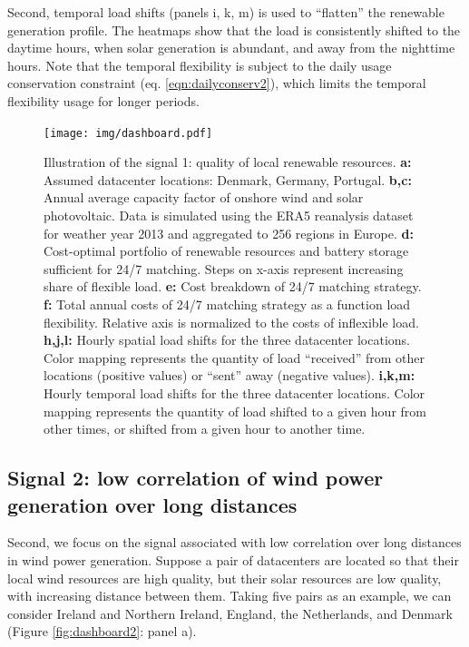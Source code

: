 Second, temporal load shifts (panels i, k, m) is used to \enquote{flatten} the renewable generation profile. The heatmaps show that the load is consistently shifted to the daytime hours, when solar generation is abundant, and away from the nighttime hours. Note that the temporal flexibility is subject to the daily usage conservation constraint (eq. \ref{eqn:dailyconserv2}), which limits the temporal flexibility usage for longer periods.


\begin{figure}
    \centering
    \texttt{[image: img/dashboard.pdf]}
    \caption{Illustration of the signal 1: quality of local renewable resources.
        \textbf{a:} Assumed datacenter locations: Denmark, Germany, Portugal.
        \textbf{b,c:} Annual average capacity factor of onshore wind and solar photovoltaic. Data is simulated using the ERA5 reanalysis dataset for weather year 2013 and aggregated to 256 regions in Europe.
        \textbf{d:} Cost-optimal portfolio of renewable resources and battery storage sufficient for 24/7 matching. Steps on x-axis represent increasing share of flexible load.
        \textbf{e:} Cost breakdown of 24/7 matching strategy.
        \textbf{f:} Total annual costs of 24/7 matching strategy as a function load flexibility. Relative axis is normalized to the costs of inflexible load.
        \textbf{h,j,l:} Hourly spatial load shifts for the three datacenter locations. Color mapping represents the quantity of load \enquote{received} from other locations (positive values) or \enquote{sent} away (negative values).
        \textbf{i,k,m:} Hourly temporal load shifts for the three datacenter locations. Color mapping represents the quantity of load shifted to a given hour from other times, or shifted from a given hour to another time.}
    \label{fig:dashboard1}
\end{figure}


\subsection{Signal 2: low correlation of wind power generation over long distances}

Second, we focus on the signal associated with low correlation over long distances in wind power generation. Suppose a pair of datacenters are located so that their local wind resources are high quality, but their solar resources are low quality, with increasing distance between them. Taking five pairs as an example, we can consider Ireland and Northern Ireland, England, the Netherlands, and Denmark (Figure \ref{fig:dashboard2}: panel a).

